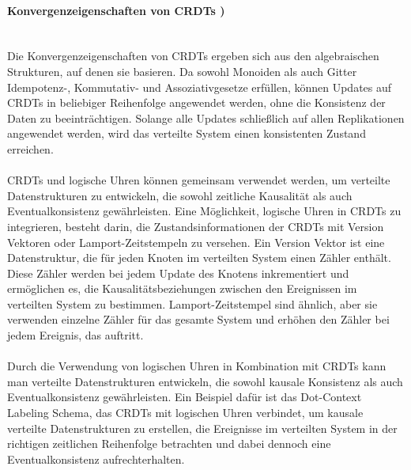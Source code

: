 \documentclass[../vs-script-first-v01.tex]{subfiles}
\begin{document}
\paragraph{Konvergenzeigenschaften von CRDTs )}\mbox{}\\
Die Konvergenzeigenschaften von CRDTs ergeben sich aus den algebraischen Strukturen, auf denen sie basieren. Da sowohl Monoiden als auch Gitter Idempotenz-, Kommutativ- und Assoziativgesetze erfüllen, können Updates auf CRDTs in beliebiger Reihenfolge angewendet werden, ohne die Konsistenz der Daten zu beeinträchtigen. Solange alle Updates schließlich auf allen Replikationen angewendet werden, wird das verteilte System einen konsistenten Zustand erreichen.
\\\\
CRDTs und logische Uhren können gemeinsam verwendet werden, um verteilte Datenstrukturen zu entwickeln, die sowohl zeitliche Kausalität als auch Eventualkonsistenz gewährleisten. Eine Möglichkeit, logische Uhren in CRDTs zu integrieren, besteht darin, die Zustandsinformationen der CRDTs mit Version Vektoren oder Lamport-Zeitstempeln zu versehen.
Ein Version Vektor ist eine Datenstruktur, die für jeden Knoten im verteilten System einen Zähler enthält. Diese Zähler werden bei jedem Update des Knotens inkrementiert und ermöglichen es, die Kausalitätsbeziehungen zwischen den Ereignissen im verteilten System zu bestimmen. Lamport-Zeitstempel sind ähnlich, aber sie verwenden einzelne Zähler für das gesamte System und erhöhen den Zähler bei jedem Ereignis, das auftritt.
\\\\
Durch die Verwendung von logischen Uhren in Kombination mit CRDTs kann man verteilte Datenstrukturen entwickeln, die sowohl kausale Konsistenz als auch Eventualkonsistenz gewährleisten. Ein Beispiel dafür ist das Dot-Context Labeling Schema, das CRDTs mit logischen Uhren verbindet, um kausale verteilte Datenstrukturen zu erstellen, die Ereignisse im verteilten System in der richtigen zeitlichen Reihenfolge betrachten und dabei dennoch eine Eventualkonsistenz aufrechterhalten.
\end{document}
